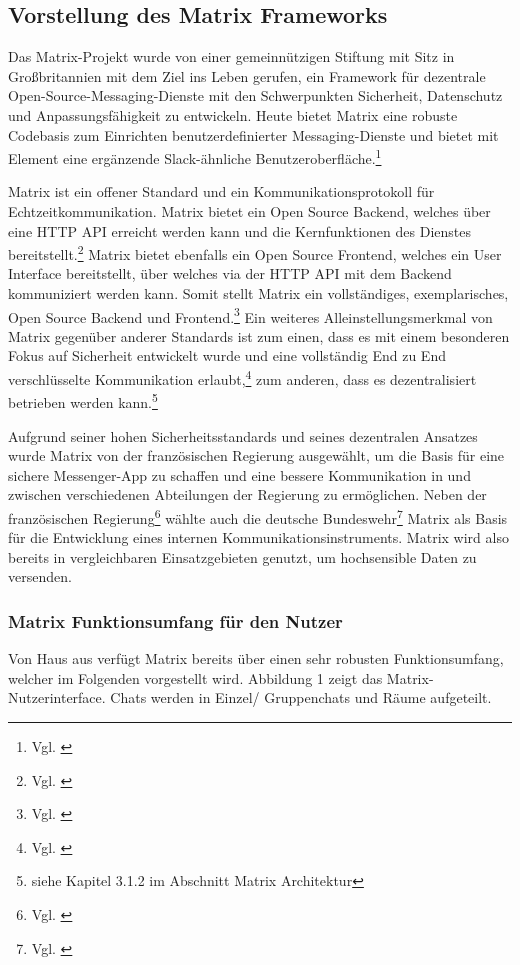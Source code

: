 \subsection{Vorstellung des Matrix Frameworks}\label{chapter:vdmf}
Das Matrix-Projekt wurde von einer gemeinnützigen Stiftung mit Sitz in Großbritannien mit dem Ziel ins Leben gerufen, ein Framework für dezentrale Open-Source-Messaging-Dienste mit den Schwerpunkten Sicherheit, Datenschutz und Anpassungsfähigkeit zu entwickeln. Heute bietet Matrix eine robuste Codebasis zum Einrichten benutzerdefinierter Messaging-Dienste und bietet mit Element eine ergänzende Slack-ähnliche Benutzeroberfläche.\footnote{Vgl. \cite{Matrix.org2020}}

Matrix ist ein offener Standard und ein Kommunikationsprotokoll für  Echtzeitkommunikation. Matrix bietet ein Open Source Backend, welches über eine HTTP API erreicht werden kann und die Kernfunktionen des Dienstes bereitstellt.\footnote{Vgl. \cite{Matrix.org2020}} Matrix bietet ebenfalls ein Open Source Frontend, welches ein User Interface bereitstellt, über welches via der HTTP API mit dem Backend kommuniziert werden kann. Somit stellt Matrix ein vollständiges, exemplarisches, Open Source Backend und Frontend.\footnote{Vgl. \cite{Github2020}} 
Ein weiteres Alleinstellungsmerkmal von Matrix gegenüber anderer Standards ist zum einen, dass es mit einem besonderen Fokus auf Sicherheit entwickelt wurde und eine vollständig End zu End verschlüsselte Kommunikation  erlaubt,\footnote{Vgl. \cite[S. 1 ff.]{Nccgroup2016}} zum anderen, dass es dezentralisiert betrieben werden kann.\footnote{siehe Kapitel 3.1.2 im Abschnitt Matrix Architektur}

Aufgrund seiner hohen Sicherheitsstandards und seines dezentralen Ansatzes wurde Matrix  von der französischen Regierung ausgewählt, um die Basis für eine sichere Messenger-App zu schaffen und eine bessere Kommunikation in und zwischen verschiedenen Abteilungen der Regierung zu ermöglichen. Neben der französischen Regierung\footnote{Vgl. \cite{Republique-Francaise2018}} wählte auch die deutsche Bundeswehr\footnote{Vgl. \cite{Weiss2020}} Matrix als Basis für die Entwicklung eines internen Kommunikationsinstruments. Matrix wird also bereits in vergleichbaren Einsatzgebieten genutzt, um hochsensible Daten zu versenden.

\subsubsection{Matrix Funktionsumfang für den Nutzer}\label{chapter:aemn}
Von Haus aus verfügt Matrix bereits über einen sehr robusten Funktionsumfang, welcher im Folgenden vorgestellt wird.
Abbildung 1 zeigt das Matrix-Nutzerinterface. Chats werden in Einzel/ Gruppenchats und Räume aufgeteilt.

